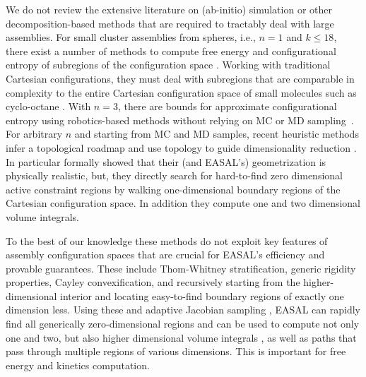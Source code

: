 We do not review the extensive literature on (ab-initio) simulation or other
decomposition-based methods that are required to tractably deal with large
assemblies.  For small cluster assemblies from spheres, i.e., $n=1$ and $k\le
18$, there exist a number of methods to compute free energy and configurational
entropy of subregions of the configuration space
\cite{Holmes-Cerfon2013,Arkus2009,Wales2010,Beltran-Villegas2011,Calvo2012,Khan2012,Hoy2012,Hoy2014}.
Working with traditional Cartesian configurations, they must deal with
subregions that are comparable in complexity to the entire Cartesian
configuration space of small molecules such as cyclo-octane
\cite{Martin2010,Jaillet2011,Porta2007}. With $n=3$, there are bounds for
approximate configurational entropy using robotics-based methods without
relying on MC or MD sampling~\cite{GregoryS201199}. For arbitrary $n$ and
starting from MC and MD samples, recent heuristic methods infer a topological
roadmap
\cite{Gfeller_DeLachapelle_DeLos_Rios_Caldarelli_Rao_2007,Varadhan_Kim_Krishnan_Manocha_2006,Lai_Su_Chen_Wang_2009,10.1371/journal.pcbi.1000415}
and use topology to guide dimensionality reduction
\cite{Yao_Sun_Huang_Bowman_Singh_Lesnick_Guibas_Pande_Carlsson_2009}. In
particular \cite{Holmes-Cerfon2013} formally showed that their (and EASAL's)
geometrization is physically realistic, but, they directly search for
hard-to-find zero dimensional active constraint regions by walking
one-dimensional boundary regions of the Cartesian configuration space. In
addition they compute one and two dimensional volume integrals. 

To the best of our knowledge these methods do not exploit key features of
assembly configuration spaces that are crucial for EASAL's efficiency and
provable guarantees. These include Thom-Whitney stratification, generic
rigidity properties, Cayley convexification, and recursively starting from the
higher-dimensional interior and locating easy-to-find boundary regions of
exactly one dimension less. Using these and adaptive Jacobian sampling
\cite{Ozkan2014Jacobian}, EASAL can rapidly find all generically
zero-dimensional regions and can be used to compute not only one and two, but
also higher dimensional volume integrals \cite{Ozkan2014MainEasal}, as well as
paths that pass through multiple regions of various dimensions. This is
important for free energy and kinetics computation.


